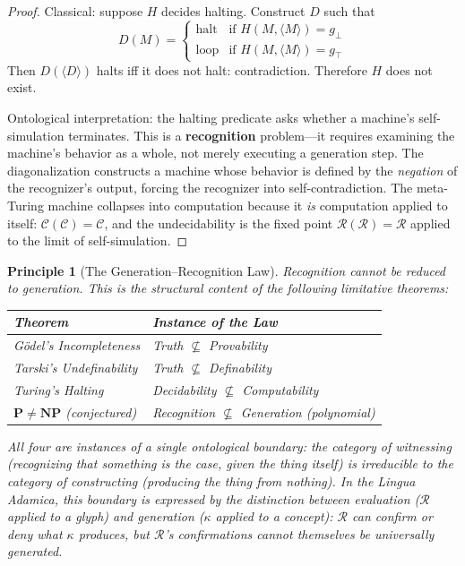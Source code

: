 \documentclass[12pt, letterpaper]{book}
\def\equiv{=}%
\def\mathfrak#1{#1}%
\newtheorem{principle}{Principle}[chapter]
\begin{document}
\begin{proof}
Classical: suppose $H$ decides halting. Construct $D$ such that
\[
D(M) = \begin{cases} \text{halt} & \text{if } H(M,\langle M \rangle) = \mathfrak{g}_\bot \\ \text{loop} & \text{if } H(M,\langle M \rangle) = \mathfrak{g}_\top \end{cases}
\]
Then $D(\langle D \rangle)$ halts iff it does not halt: contradiction. Therefore $H$ does not exist.

Ontological interpretation: the halting predicate asks whether a machine's self-simulation terminates. This is a \textbf{recognition} problem---it requires examining the machine's behavior as a whole, not merely executing a generation step. The diagonalization constructs a machine whose behavior is defined by the \textit{negation} of the recognizer's output, forcing the recognizer into self-contradiction. The meta-Turing machine collapses into computation because it \textit{is} computation applied to itself: $\mathcal{C}(\mathcal{C}) \equiv \mathcal{C}$, and the undecidability is the fixed point $\mathcal{R}(\mathcal{R}) \equiv \mathcal{R}$ applied to the limit of self-simulation.
\end{proof}

\begin{principle}[The Generation--Recognition Law]\label{pr:gen-rec}
Recognition cannot be reduced to generation. This is the structural content of the following limitative theorems:
\begin{center}
\renewcommand{\arraystretch}{1.3}
\begin{tabular}{ll}
\toprule
\textbf{Theorem} & \textbf{Instance of the Law} \\
\midrule
G\"odel's Incompleteness & Truth $\not\subseteq$ Provability \\
Tarski's Undefinability & Truth $\not\subseteq$ Definability \\
Turing's Halting & Decidability $\not\subseteq$ Computability \\
$\mathbf{P} \neq \mathbf{NP}$ (conjectured) & Recognition $\not\subseteq$ Generation (polynomial) \\
\bottomrule
\end{tabular}
\end{center}
All four are instances of a single ontological boundary: the category of \textit{witnessing} (recognizing that something is the case, given the thing itself) is irreducible to the category of \textit{constructing} (producing the thing from nothing). In the Lingua Adamica, this boundary is expressed by the distinction between evaluation ($\mathcal{R}$ applied to a glyph) and generation ($\kappa$ applied to a concept): $\mathcal{R}$ can confirm or deny what $\kappa$ produces, but $\mathcal{R}$'s confirmations cannot themselves be universally generated.
\end{principle}
\end{document}
